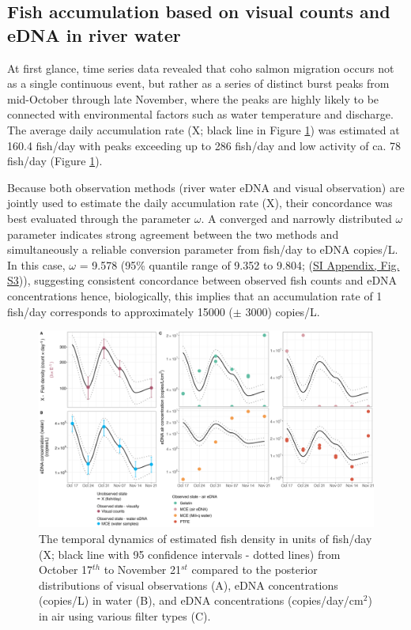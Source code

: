 \documentclass{article}
\begin{document}
\subsection{Fish accumulation based on visual counts and eDNA in river water}
At first glance, time series data revealed that coho salmon migration occurs not as a single continuous event, but rather as a series of distinct burst peaks from mid-October through late November, where the peaks are highly likely to be connected with environmental factors such as water temperature and discharge. The average daily accumulation rate (X; black line in Figure \ref{fig:fig1}) was estimated at 160.4 fish/day with peaks exceeding up to 286 fish/day and low activity of ca. 78 fish/day (Figure \ref{fig:fig1}).


Because both observation methods (river water eDNA and visual observation) are jointly used to estimate the daily accumulation rate (X), their concordance was best evaluated through the parameter $\omega$. A converged and narrowly distributed $\omega$ parameter indicates strong agreement between the two methods and simultaneously a reliable conversion parameter from fish/day to eDNA copies/L. In this case, $\omega$ = 9.578 (95\% quantile range of 9.352 to 9.804; (\href{SI_Appendix.pdf}{SI Appendix, Fig. S3})), suggesting consistent concordance between observed fish counts and eDNA concentrations hence, biologically, this implies that an accumulation rate of 1 fish/day corresponds to approximately 15000 ($\pm$ 3000) copies/L.

\begin{figure}[tbhp] 
\centering
\includegraphics[width=16.5cm]{Plots/Figure_1.jpg}  
\caption{The temporal dynamics of estimated fish density in units of fish/day (X; black line with 95 confidence intervals - dotted lines) from October 17$^{th}$ to November 21$^{st}$ compared to the posterior distributions of visual observations (A), eDNA concentrations (copies/L) in water (B), and eDNA concentrations (copies/day/cm$^2$) in air using various filter types (C).}
\label{fig:fig1}
\end{figure}
\end{document}
